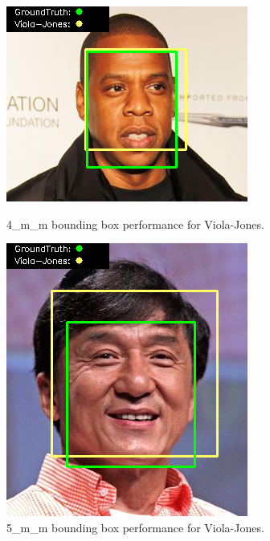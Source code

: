 \documentclass{l4proj}
\begin{document}
\begin{appendices}
\begin{figure}[h!]
  \centering
  \begin{minipage}{0.49\textwidth}
    \centering
     \includegraphics[width=\textwidth]{images/appendix/viola/4.png}
    \caption{4\_m\_m bounding box performance for Viola-Jones.}
    \label{whoopi_result}
  \end{minipage}
    \hfill
    \begin{minipage}{0.49\textwidth}
    \centering
     \includegraphics[width=\textwidth]{images/appendix/viola/5.png}
    \caption{5\_m\_m bounding box performance for Viola-Jones.}
    \label{whoopi_result}
  \end{minipage}
\end{figure}


\end{appendices}
\end{document}
